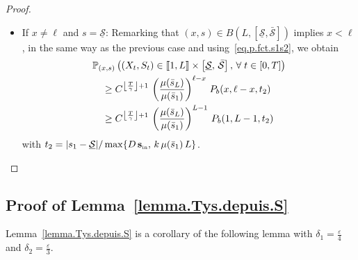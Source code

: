 \documentclass[10pt]{amsart}
\theoremstyle{definition}\newtheorem{defi}[theo]{Definition}\newtheorem{rema}[theo]{Remark}\newtheorem{exam}[theo]{Example}\newtheorem{exem}[theo]{Example}\newtheorem{nota}[theo]{Notation}
\newcommand{\llbracket}{\mathopen{[\mkern -2.7mu[}}
\newcommand{\rrbracket}{\mathclose{]\mkern -2.7mu]}}
\newcommand{\PP}{\mathbb{P}}
\newcommand{\Sin}{{\mathbf s}_{\textrm{\tiny\rm in}}}
\newcommand{\Smin}{\underline{\mathcal{S}}}
\newcommand{\Smax}{\bar{\mathcal{S}}}
\newcommand{\barmu}{\mu(\bar s_1)}
\newcommand{\setunL}{\llbracket 1, L\rrbracket}
\newcommand{\1}{\mathbf{1}}
\let\oldforall\forall
\renewcommand*{\forall}{\mathrel{\oldforall}}
\begin{document}
\begin{proof}
\begin{itemize}
\item If $x\neq \ell$ and $s=\Smin$: Remarking that $(x,s)\in B(L,[\Smin,\Smax])$ implies $x < \ell$, in the same way as the previous case and using~\eqref{eq.p.fct.s1s2}, we obtain
\begin{align*}
 & \PP_{(x,s)}
\left(\left(X_t,S_t\right) \in \setunL \times \left[\Smin, \, \Smax\right], \,
\forall t\in[0,T]\right)
\\
& \quad \geq C^{\left\lfloor\frac{T}{\gamma}\right\rfloor+1}\, \left(\frac{\mu(\bar s_L)}{\barmu}\right)^{\ell-x}
\,P_b(x,\ell-x, t_2)
\\
&
\quad\geq C^{\left\lfloor\frac{T}{\gamma}\right\rfloor+1}\, \left(\frac{\mu(\bar s_L)}{\barmu}\right)^{L-1}\, P_b(1,L-1, t_2)
\end{align*}
with $t_2 = |s_1-\Smin|/\max\{D\,\Sin,\, k\,\barmu\,L\}$. \qedhere
\end{itemize}
\end{proof}


\subsection{Proof of Lemma~\ref{lemma.Tys.depuis.S}}\label{sec:T.depuis.S}



Lemma~\ref{lemma.Tys.depuis.S} is a corollary of the following lemma with $\delta_1=\frac{\varepsilon}{4}$ and $\delta_2=\frac{\varepsilon}{3}$.
\end{document}
